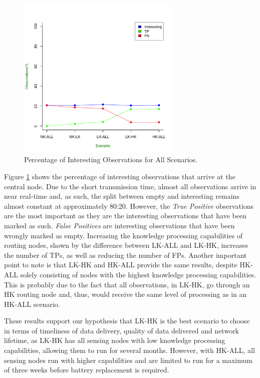 \begin{figure}[h]
	\centering
	\includegraphics[width=0.70\textwidth]{Chap7/figures/ideal_int_percent}
	\caption{Percentage of Interesting Observations for All Scenarios.}
	\label{fig:res:ideal:int}
\end{figure}

Figure \ref{fig:res:ideal:int} shows the percentage of interesting observations that arrive at the central node. Due to the short transmission time, almost all observations arrive in near real-time and, as such, the split between empty and interesting remains almost constant at approximately 80:20. However, the \textit{True Positive} observations are the most important as they are the interesting observations that have been marked as such. \textit{False Positives} are interesting observations that have been wrongly marked as empty. Increasing the knowledge processing capabilities of routing nodes, shown by the difference between LK-ALL and LK-HK, increases the number of TPs, as well as reducing the number of FPs. Another important point to note is that LK-HK and HK-ALL provide the same results, despite HK-ALL solely consisting of nodes with the highest knowledge processing capabilities.  This is probably due to the fact that all observations, in LK-HK, go through an HK routing node and, thus, would receive the same level of processing as in an HK-ALL scenario.

These results support our hypothesis that LK-HK is the best scenario to choose in terms of timeliness of data delivery, quality of data delivered and network lifetime, as LK-HK has all sensing nodes with low knowledge processing capabilities, allowing them to run for several months. However, with HK-ALL, all sensing nodes run with higher capabilities and are limited to run for a maximum of three weeks before battery replacement is required.

